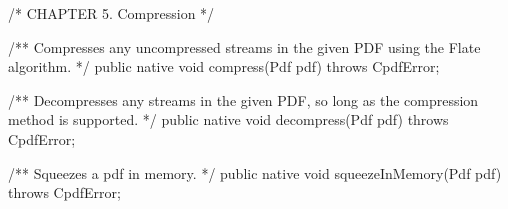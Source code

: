 /* CHAPTER 5. Compression */

/** Compresses any uncompressed streams in the given PDF using the Flate
algorithm. */
public native void compress(Pdf pdf) throws CpdfError;

/** Decompresses any streams in the given PDF, so long as the compression
method is supported. */
public native void decompress(Pdf pdf) throws CpdfError;

/** Squeezes a pdf in memory. */
public native void squeezeInMemory(Pdf pdf) throws CpdfError;
